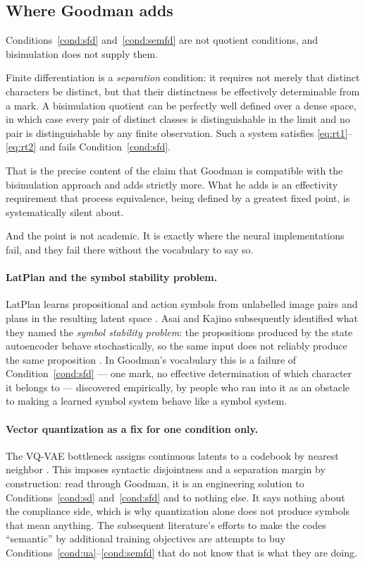 \subsection{Where Goodman adds}
\label{sec:adds}

Conditions~\ref{cond:sfd} and~\ref{cond:semfd} are not quotient
conditions, and bisimulation does not supply them.

\begin{observation}
\label{obs:sep}
Finite differentiation is a \emph{separation} condition: it
requires not merely that distinct characters be distinct, but that
their distinctness be effectively determinable from a mark.
A bisimulation quotient can be perfectly well defined over a dense
space, in which case every pair of distinct classes is
distinguishable in the limit and no pair is distinguishable by any
finite observation.
Such a system satisfies \eqref{eq:rt1}--\eqref{eq:rt2} and fails
Condition~\ref{cond:sfd}.
\end{observation}

\noindent
That is the precise content of the claim that Goodman is compatible
with the bisimulation approach and adds strictly more.
What he adds is an effectivity requirement that process
equivalence, being defined by a greatest fixed point, is
systematically silent about.

And the point is not academic.
It is exactly where the neural implementations fail, and they fail
there without the vocabulary to say so.

\paragraph{LatPlan and the symbol stability problem.}
LatPlan learns propositional and action symbols from unlabelled
image pairs and plans in the resulting latent space
\cite{asai2018}.
Asai and Kajino subsequently identified what they named the
\emph{symbol stability problem}: the propositions produced by the
state autoencoder behave stochastically, so the same input does not
reliably produce the same proposition \cite{asai2019}.
In Goodman's vocabulary this is a failure of
Condition~\ref{cond:sfd} --- one mark, no effective determination
of which character it belongs to --- discovered empirically, by
people who ran into it as an obstacle to making a learned symbol
system behave like a symbol system.

\paragraph{Vector quantization as a fix for one condition only.}
The VQ-VAE bottleneck assigns continuous latents to a codebook by
nearest neighbor \cite{oord2017}.
This imposes syntactic disjointness and a separation margin by
construction: read through Goodman, it is an engineering solution
to Conditions~\ref{cond:sd} and~\ref{cond:sfd} and to nothing else.
It says nothing about the compliance side, which is why
quantization alone does not produce symbols that mean anything.
The subsequent literature's efforts to make the codes ``semantic''
by additional training objectives are attempts to buy
Conditions~\ref{cond:ua}--\ref{cond:semfd} that do not know that is
what they are doing.

